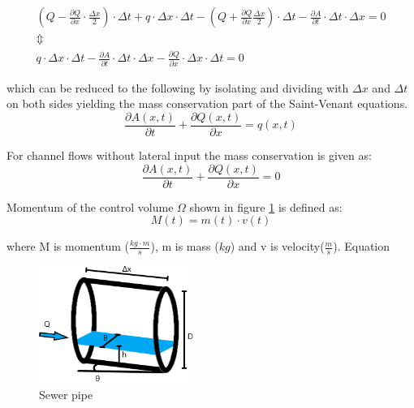 \begin{equation}
\begin{array}{l}
	\left(Q - \frac{\partial Q}{\partial x}\cdot \frac{\Delta x}{2}\right) \cdot \Delta t + q \cdot \Delta x \cdot \Delta t - \left(Q + \frac{\partial Q}{ \partial x} \frac{\Delta x}{2} \right) \cdot \Delta t - \frac{\partial A}{\partial t}\cdot \Delta t 
	\cdot \Delta x = 0 \\ 
\Updownarrow \\
q \cdot \Delta x \cdot \Delta t -\frac{\partial A}{\partial t} \cdot \Delta t 
	\cdot \Delta x - \frac{\partial Q}{\partial x} \cdot \Delta x \cdot \Delta t  = 0 
\end{array}
\label{saintbernard_masse}
\end{equation}

which can be reduced to the following by isolating and dividing with $\Delta x$ and $\Delta t$ on both sides yielding the mass conservation part of the Saint-Venant equations.
\begin{equation}	
\frac{\partial A(x,t)}{\partial t} + \frac{\partial Q(x,t)}{\partial x}=q(x,t)
\label{saintbernard_mass_lateral}
\end{equation}

For channel flows without lateral input the mass conservation is given as:
\begin{equation}	
\frac{\partial A(x,t)}{\partial t} + \frac{\partial Q(x,t)}{\partial x}=0
\label{saintbernard_mass}
\end{equation}

Momentum of the control volume $\Omega$ shown in figure \ref{fig:kloakroer} is defined as:
\begin{equation}
M(t) = m(t) \cdot v(t)
\label{eq:momentum_definition}
\end{equation}  

where M is momentum ($\frac{kg \cdot m}{s}$), m is mass ($kg$) and v is velocity($\frac{m}{s}$). Equation




\begin{figure}[H]
\centering
\includegraphics[width=0.45\textwidth]{report/modeling/pictures/kloakroer.png}
\caption{Sewer pipe }
\label{fig:kloakroer}
\end{figure}








